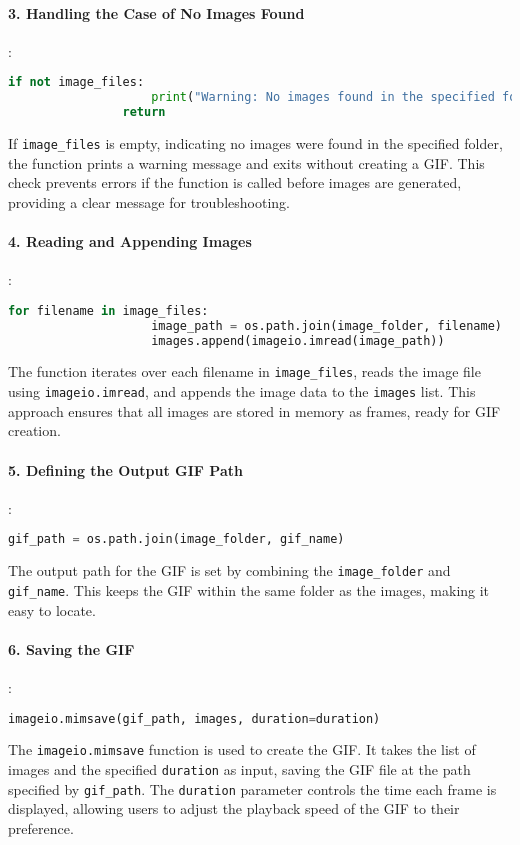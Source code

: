 \documentclass{article}
\begin{document}
			\paragraph{3. Handling the Case of No Images Found}
			:
			\begin{lstlisting}[language=Python]
				if not image_files:
					print("Warning: No images found in the specified folder to create a GIF. Ensure that images are saved correctly during the wave equation simulation.")
				return
			\end{lstlisting}
			If \texttt{image\_files} is empty, indicating no images were found in the specified folder, the function prints a warning message and exits without creating a GIF. This check prevents errors if the function is called before images are generated, providing a clear message for troubleshooting.
			
			\paragraph{4. Reading and Appending Images}
			:
			\begin{lstlisting}[language=Python]
				for filename in image_files:
					image_path = os.path.join(image_folder, filename)
					images.append(imageio.imread(image_path))
			\end{lstlisting}
			The function iterates over each filename in \texttt{image\_files}, reads the image file using \texttt{imageio.imread}, and appends the image data to the \texttt{images} list. This approach ensures that all images are stored in memory as frames, ready for GIF creation.
			
			\paragraph{5. Defining the Output GIF Path}
			:
			\begin{lstlisting}[language=Python]
				gif_path = os.path.join(image_folder, gif_name)
			\end{lstlisting}
			The output path for the GIF is set by combining the \texttt{image\_folder} and \texttt{gif\_name}. This keeps the GIF within the same folder as the images, making it easy to locate.
			
			\paragraph{6. Saving the GIF}
			:
			\begin{lstlisting}[language=Python]
				imageio.mimsave(gif_path, images, duration=duration)
			\end{lstlisting}
			The \texttt{imageio.mimsave} function is used to create the GIF. It takes the list of images and the specified \texttt{duration} as input, saving the GIF file at the path specified by \texttt{gif\_path}. The \texttt{duration} parameter controls the time each frame is displayed, allowing users to adjust the playback speed of the GIF to their preference.
			
\end{document}
